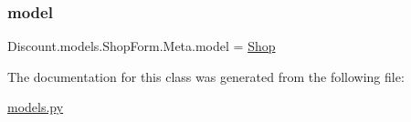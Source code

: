 \subsubsection{\texorpdfstring{model}{model}}
{\footnotesize\ttfamily Discount.\+models.\+Shop\+Form.\+Meta.\+model = \hyperlink{class_discount_1_1models_1_1_shop}{Shop}\hspace{0.3cm}{\ttfamily [static]}}



The documentation for this class was generated from the following file\+:\begin{DoxyCompactItemize}
\item 
\hyperlink{models_8py}{models.\+py}\end{DoxyCompactItemize}
